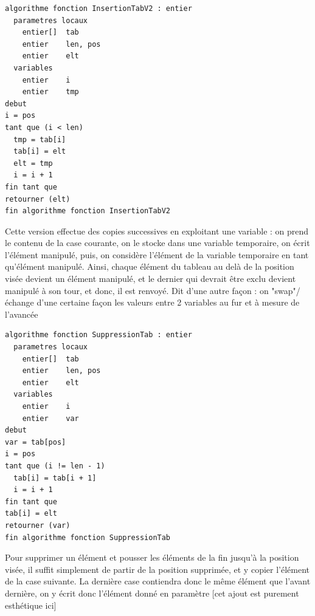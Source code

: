 \documentclass[11pt,a4paper]{article}
\begin{document}
\begin{table}[ht!]
  \centering
\begin{lstlisting}[style=algorithmique]
algorithme fonction InsertionTabV2 : entier
  parametres locaux
    entier[]  tab
    entier    len, pos
    entier    elt
  variables
    entier    i
    entier    tmp
debut
i = pos
tant que (i < len)
  tmp = tab[i]
  tab[i] = elt
  elt = tmp
  i = i + 1
fin tant que
retourner (elt)
fin algorithme fonction InsertionTabV2 \end{lstlisting}
  \caption{Cette version effectue des copies successives en exploitant une variable : on prend le contenu de la case courante, on le stocke dans une variable temporaire, on écrit l'élément manipulé, puis, on considère l'élément de la variable temporaire en tant qu'élément manipulé. Ainsi, chaque élément du tableau au delà de la position visée devient un élément manipulé, et le dernier qui devrait être exclu devient manipulé à son tour, et donc, il est renvoyé. Dit d'une autre façon : on "swap"/échange d'une certaine façon les valeurs entre 2 variables au fur et à mesure de l'avancée }
\end{table}

\vfillLast

\newpage

\vfillFirst


\begin{table}[ht!]
  \centering
\begin{lstlisting}[style=algorithmique]
algorithme fonction SuppressionTab : entier
  parametres locaux
    entier[]  tab
    entier    len, pos
    entier    elt
  variables
    entier    i
    entier    var
debut
var = tab[pos]
i = pos
tant que (i != len - 1)
  tab[i] = tab[i + 1]
  i = i + 1
fin tant que
tab[i] = elt
retourner (var)
fin algorithme fonction SuppressionTab \end{lstlisting}
  \caption{Pour supprimer un élément et pousser les éléments de la fin jusqu'à la position visée, il suffit simplement de partir de la position supprimée, et y copier l'élément de la case suivante. La dernière case contiendra donc le même élément que l'avant dernière, on y écrit donc l'élément donné en paramètre [cet ajout est purement esthétique ici] }
\end{table}
\end{document}
